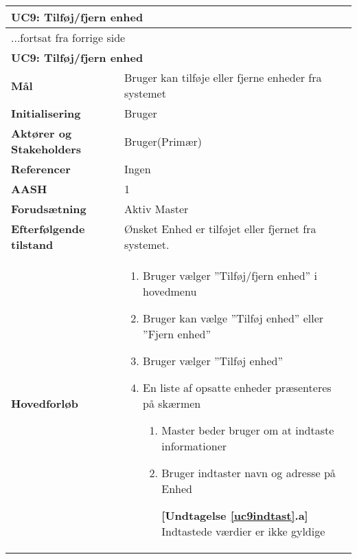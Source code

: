 \begin{center} \centering \label{UC9}
	\begin{longtable}{|p{5cm}|p{9cm}|}  %
	\hline
		\multicolumn{2}{|l|}{\textbf{UC9: Tilføj\slash fjern enhed}} \\\hline %
		\endfirsthead
		
		\multicolumn{2}{l}{...fortsat fra forrige side} \\ \hline %
		\multicolumn{2}{|l|}{\textbf{UC9: Tilføj\slash fjern enhed}} \\\hline %
		\endhead	
		
		\textbf{Mål}								&Bruger kan tilføje eller fjerne enheder fra systemet			\\\hline
		\textbf{Initialisering}					&Bruger														\\\hline
		\textbf{Aktører og Stakeholders}			&Bruger(Primær)												\\\hline
		\textbf{Referencer}						&Ingen														\\\hline
		\textbf{AASH}							&1															\\\hline
		\textbf{Forudsætning}					&Aktiv Master											\\\hline
		\textbf{Efterfølgende tilstand}			&Ønsket Enhed er tilføjet eller fjernet fra systemet.		\\\hline
		\textbf{Hovedforløb}					
			&\begin{enumerate}
	
				\item Bruger vælger ''Tilføj/fjern enhed'' i hovedmenu
				
				\item \label{uc9valg} Bruger kan vælge ''Tilføj enhed'' eller ''Fjern enhed''
				
				\item Bruger vælger ''Tilføj enhed''
				
				\item En liste af opsatte enheder præsenteres på skærmen				
				
				\begin{enumerate}
					\item \label{uc9indtast} Master beder bruger om at indtaste informationer
					
					\item \label{uc9indtast_fejl} Bruger indtaster navn og adresse på Enhed
					
						\textbf{[Undtagelse \ref{uc9indtast}.a]} \newline
						Indtastede værdier er ikke gyldige
					

\end{enumerate}
\end{enumerate}
\end{longtable}
\end{center}
